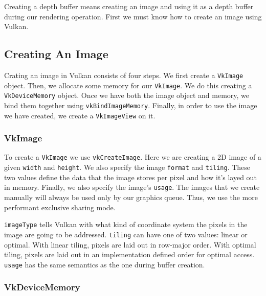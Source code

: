 Creating a depth buffer means creating an image and using
it as a depth buffer during our rendering operation.
First we must know how to create an image using Vulkan.

\subsection{Creating An Image}

Crating an image in Vulkan consists of four steps.
We first create a \texttt{VkImage} object.
Then, we allocate some memory for our \texttt{VkImage}.
We do this creating a \texttt{VkDeviceMemory} object.
Once we have both the image object and memory, we bind
them together using \texttt{vkBindImageMemory}.
Finally, in order to use the image we have created, we
create a \texttt{VkImageView} on it.

\subsubsection{VkImage}

To create a \texttt{VkImage} we use \texttt{vkCreateImage}.
Here we are creating a 2D image of a given \texttt{width}
and \texttt{height}.
We also specify the image \texttt{format} and \texttt{tiling}.
These two values define the data that the image stores per pixel
and how it's layed out in memory.
Finally, we also specify the image's \texttt{usage}.
The images that we create manually will always be used only
by our graphics queue.
Thus, we use the more performant exclusive sharing mode.

\begin{minipage}{\linewidth}{\noindent}
    
\end{minipage}

\texttt{imageType} tells Vulkan with what kind of coordinate
system the pixels in the image are going to be addressed.
\texttt{tiling} can have one of two values: linear or optimal.
With linear tiling, pixels are laid out in row-major order.
With optimal tiling, pixels are laid out in an implementation
defined order for optimal access.
\texttt{usage} has the same semantics as the one during buffer creation.

\subsubsection{VkDeviceMemory}

